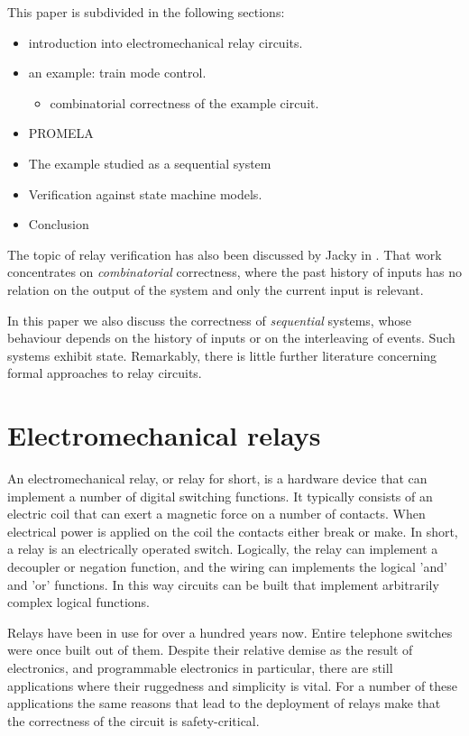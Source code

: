 This paper is subdivided in the following sections:
\begin{itemize}
\item introduction into electromechanical relay circuits.
\item an example: train mode control.
	\begin{itemize}
	\item combinatorial correctness of the example circuit.
	\end{itemize}
\item PROMELA\cite{GH91}
\item The example studied as a sequential system
\item Verification against state machine models.
\item Conclusion
\end{itemize}
The topic of relay verification has also been discussed by Jacky in \cite{JJ91}.
That work concentrates on {\em combinatorial}
correctness, where the past history of inputs has no relation on the output
of the system and only the current input is relevant.

In this paper we also discuss the correctness of {\em sequential} systems,
whose behaviour depends on the history of inputs or on the interleaving
of events. Such systems exhibit state.
Remarkably, there is little further literature concerning formal approaches to relay
circuits.


\section{Electromechanical relays}

An electromechanical relay, or relay for short, is a hardware device that can implement a
number of digital switching functions.
It typically consists of an electric coil that can exert a magnetic force on a number of contacts.
When electrical power is applied on the coil the contacts either break or make. 
In short, a relay is an electrically operated switch.
Logically, the relay can implement a decoupler or negation function, and the wiring can
implements the logical 'and' and 'or' functions.
In this way circuits can be built that implement arbitrarily complex logical functions.

Relays have been in use for over a hundred years now. Entire telephone switches were once
built out of them.
Despite their relative demise as the result of electronics, and programmable electronics in
particular, there are still applications where their ruggedness and simplicity is vital.
For a number of these applications the same reasons that lead to the deployment of relays make
that the correctness of the circuit is safety-critical. 

